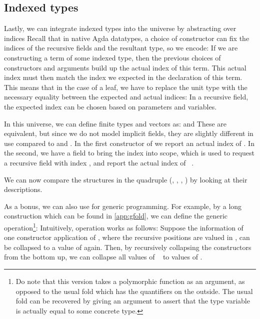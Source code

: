 \subsection{Indexed types}\label{ssec:background-ix}
Lastly, we can integrate indexed types into the universe by abstracting over indices
Recall that in native Agda datatypes, a choice of constructor can fix the indices of the recursive fields and the resultant type, so we encode:
If we are constructing a term of some indexed type, then the previous choices of constructors and arguments build up the actual index of this term. This actual index must then match the index we expected in the declaration of this term. This means that in the case of a leaf, we have to replace the unit type with the necessary equality between the expected and actual indices:
In a recursive field, the expected index can be chosen based on parameters and variables. %

In this universe, we can define finite types and vectors as:
and
These are equivalent, but since we do not model implicit fields, they are slightly different in use compared to  and . In the first constructor of  we report an actual index of . In the second, we have a field \bN{} to bring the index  into scope, which is used to request a recursive field with index , and report the actual index of \ .

We can now compare the structures in the quadruple (\bN{}, , , ) by looking at their descriptions.

As a bonus, we can also use  for generic programming. For example, by a long construction which can be found in \autoref{app:gfold}, we can define the generic  operation\footnote{Do note that this version takes a polymorphic function as an argument, as opposed to the usual fold which has the quantifiers on the outside. The usual fold can be recovered by giving  an argument to assert that the type variable is actually equal to some concrete type.}:
Intuitively,  operation works as follows: Suppose the information of one constructor application of , where the recursive positions are valued in , can be collapsed to a value of  again. Then, by recursively collapsing the constructors from the bottom up, we can collapse all values of \  to values of .

